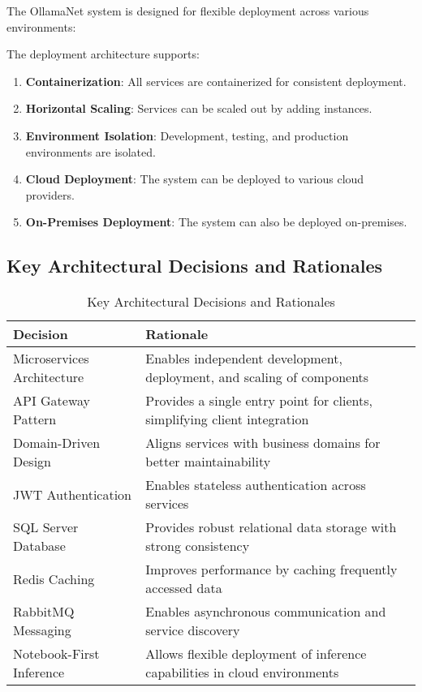 The OllamaNet system is designed for flexible deployment across various environments:


The deployment architecture supports:

\begin{enumerate}
   \item \textbf{Containerization}: All services are containerized for consistent deployment.
   \item \textbf{Horizontal Scaling}: Services can be scaled out by adding instances.
   \item \textbf{Environment Isolation}: Development, testing, and production environments are isolated.
   \item \textbf{Cloud Deployment}: The system can be deployed to various cloud providers.
   \item \textbf{On-Premises Deployment}: The system can also be deployed on-premises.
\end{enumerate}

\subsection{Key Architectural Decisions and Rationales}

\begin{table}[h]
  \centering
  \caption{Key Architectural Decisions and Rationales}
  \label{tab:architectural-decisions}
  \begin{tabular}{|p{}|p{}|}
    \hline
    \textbf{Decision} & \textbf{Rationale} \\
    \hline
    Microservices Architecture & Enables independent development, deployment, and scaling of components \\
    \hline
    API Gateway Pattern & Provides a single entry point for clients, simplifying client integration \\
    \hline
    Domain-Driven Design & Aligns services with business domains for better maintainability \\
    \hline
    JWT Authentication & Enables stateless authentication across services \\
    \hline
    SQL Server Database & Provides robust relational data storage with strong consistency \\
    \hline
    Redis Caching & Improves performance by caching frequently accessed data \\
    \hline
    RabbitMQ Messaging & Enables asynchronous communication and service discovery \\
    \hline
    Notebook-First Inference & Allows flexible deployment of inference capabilities in cloud environments \\
    \hline
  \end{tabular}
\end{table}


